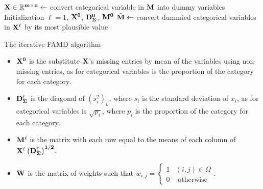 \documentclass[a4paper,12pt,authoryear]{elegantpaper}
\begin{document}
    
    \begin{algorithm}[H]
        $\bf X\in\mathbb{R}^{m\times n}\leftarrow$ convert categorical variable in $\bf M$ into dummy variables\;
        Initialization $\ell=1$, $\bf X^{0}$, $\bf D_{\Sigma}^{0}$, $\bf M^{0}$\;
        $\hat{\bf M}\leftarrow$ convert dummied categorical variables in $\bf X^{\ell}$ by its most plausible value\;
        \caption{The iterative FAMD algorithm \citep{audigier_principal_2013}}
        \label{algorithm:iterative_famd}
    \end{algorithm}
    \begin{itemize}
        \item $\bf X^{0}$ is the substitute $\bf X$'s missing entries by mean of the variables using non-missing entries, as for categorical variables is the proportion of the category for each category.
        \item $\bf D_{\Sigma}^{\ell}$ is the diagonal of $\left(s_i^2\right)_n$, where $s_i$ is the standard deviation of $x_i$, as for categorical variables is $\sqrt{p_i}$, where $p_i$ is the proportion of the category for each category.
        \item $\bf M^{\ell}$ is the matrix with each row equal to the means of each column of $\bf X^{\ell}\left(\bf D_{\Sigma}^{\ell}\right)^{1/2}$.
        \item $\bf W$ is the matrix of weights such that $w_{i,j}=\left\{\begin{array}{ll}
            1 & (i, j) \in \Omega \\
            0 & \text { otherwise }
            \end{array}\right.$.
    \end{itemize}
\end{document}
